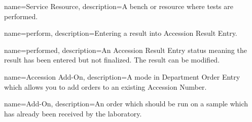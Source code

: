 {
    name={Service Resource},
    description={A bench or resource where tests are performed.}
}

{
    name={perform},
    description={Entering a result into Accession Result Entry.}
}

{
    name={performed},
    description={An Accession Result Entry status meaning the result has been entered but not finalized. The result can be modified.}
}

{
    name={Accession Add-On},
    description={A mode in Department Order Entry which allows you to add orders to an existing Accession Number.}
}

{
    name={Add-On},
    description={An order which should be run on a sample which has already been received by the laboratory.}
}

